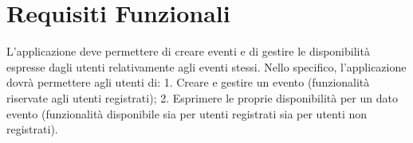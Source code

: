 \chapter{Requisiti Funzionali}

L'applicazione deve permettere di creare eventi e di gestire le disponibilità espresse dagli utenti relativamente agli eventi stessi.
Nello specifico, l'applicazione dovrà permettere agli utenti di: 
1. Creare e gestire un evento (funzionalità riservate agli utenti registrati);
2. Esprimere le proprie disponibilità per un dato evento (funzionalità disponibile sia per utenti registrati sia per utenti non registrati). 

